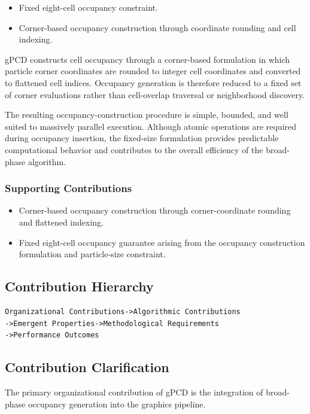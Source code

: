 \begin{itemize}
\item Fixed eight-cell occupancy constraint.
\item Corner-based occupancy construction through coordinate
      rounding and cell indexing.
\end{itemize}

gPCD constructs cell occupancy through a corner-based formulation in
which particle corner coordinates are rounded to integer cell
coordinates and converted to flattened cell indices. Occupancy
generation is therefore reduced to a fixed set of corner evaluations
rather than cell-overlap traversal or neighborhood discovery.

The resulting occupancy-construction procedure is simple, bounded, and
well suited to massively parallel execution. Although atomic operations
are required during occupancy insertion, the fixed-size formulation
provides predictable computational behavior and contributes to the
overall efficiency of the broad-phase algorithm.


\subsubsection{Supporting Contributions}


\begin{itemize}
\item Corner-based occupancy construction through corner-coordinate
      rounding and flattened indexing.
\item Fixed eight-cell occupancy guarantee arising from the occupancy
      construction formulation and particle-size constraint.
\end{itemize}

\subsection{Contribution Hierarchy}
\begin{lstlisting}
Organizational Contributions->Algorithmic Contributions
->Emergent Properties->Methodological Requirements
->Performance Outcomes
\end{lstlisting}

\subsection*{Contribution Clarification}

The primary organizational contribution of gPCD is the integration of
broad-phase occupancy generation into the graphics pipeline.

